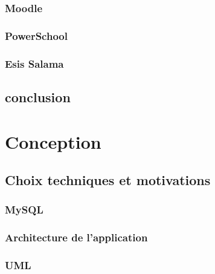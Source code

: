 \documentclass[12pt, a4paper]{report}
\begin{document}
    \subsection{Moodle}\label{subsec:moodle}
    

    \subsection{PowerSchool}\label{subsec:powerschool}
    

    \subsection{Esis Salama}\label{subsec:esis-salamae}
    

    \section{conclusion}\label{sec:conclusion}
    

    \chapter{Conception}\label{sec:conception}
    

    \section{Choix techniques et motivations}\label{sec:choix-techniques-et-motivation}
    \subsection{MySQL}\label{subsec:mysql}
    

    \subsection{Architecture de l'application}\label{sec:application-architecture}
    

    \subsection{UML}\label{sec:modeling-uml}
    
\end{document}
